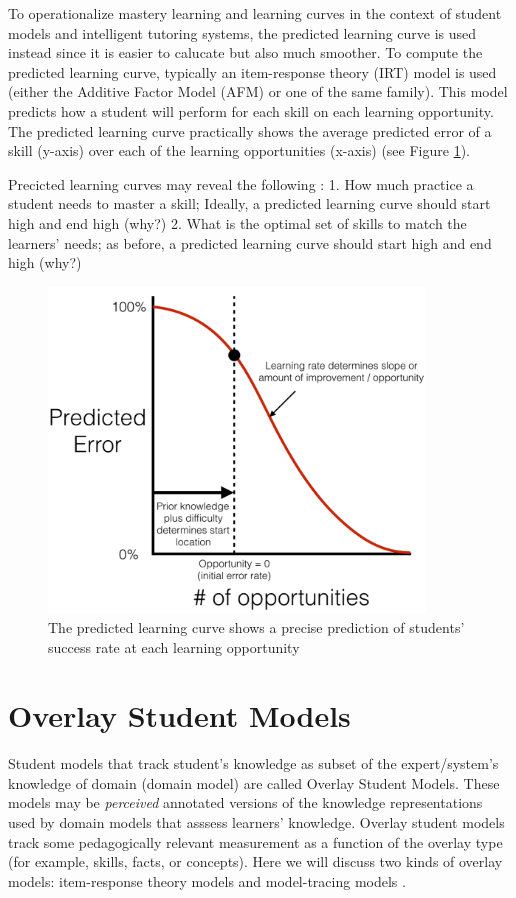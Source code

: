 \documentclass[
]{book}
\begin{document}
To operationalize mastery learning and learning curves in the context of student models and intelligent tutoring systems, the predicted learning curve is used instead since it is easier to calucate but also much smoother. To compute the predicted learning curve, typically an item-response theory (IRT) model is used (either the Additive Factor Model (AFM) or one of the same family). This model predicts how a student will perform for each skill on each learning opportunity. The predicted learning curve practically shows the average predicted error of a skill (y-axis) over each of the learning opportunities (x-axis) (see Figure \ref{fig:predictedlearningcurve}).

Precicted learning curves may reveal the following \citep{cen2007over}:
1. How much practice a student needs to master a skill; Ideally, a predicted learning curve should start high and end high (why?)
2. What is the optimal set of skills to match the learners' needs; as before, a predicted learning curve should start high and end high (why?)

\begin{figure}
\includegraphics[width=10cm]{./images/predictedlearningcurve} \caption{The predicted learning curve shows a precise prediction of students' success rate at each learning opportunity}\label{fig:predictedlearningcurve}
\end{figure}

\section{Overlay Student Models}\label{overlay-student-models}

Student models that track student's knowledge as subset of the expert/system's knowledge of domain (domain model) are called Overlay Student Models. These models may be \emph{perceived} annotated versions of the knowledge representations used by domain models that asssess learners' knowledge. Overlay student models track some pedagogically relevant measurement as a function of the overlay type (for example, skills, facts, or concepts). Here we will discuss two kinds of overlay models: item-response theory models and model-tracing models \citep{pavlik2013tutoring}.
\end{document}
